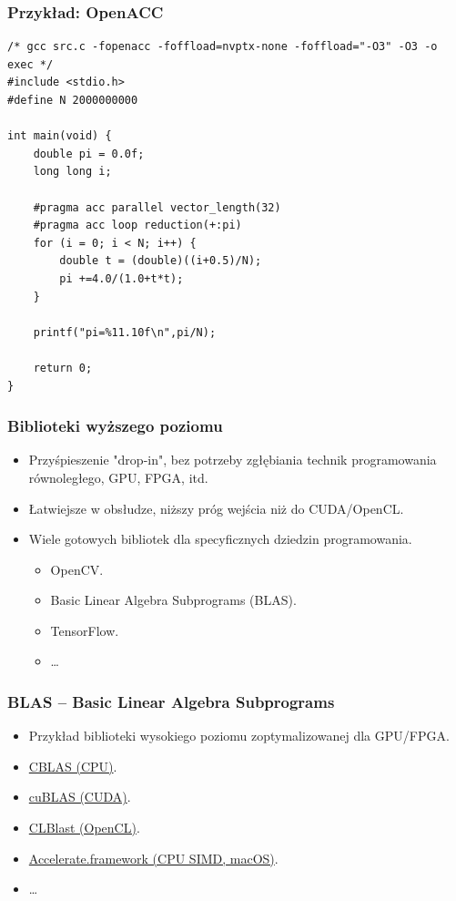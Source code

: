 \documentclass[dvipsnames,table]{beamer}
\begin{document}
\begin{frame}[fragile]
	\frametitle{Przykład: OpenACC}
\begin{lstlisting}
/* gcc src.c -fopenacc -foffload=nvptx-none -foffload="-O3" -O3 -o exec */
#include <stdio.h>
#define N 2000000000

int main(void) {
	double pi = 0.0f;
	long long i;

	#pragma acc parallel vector_length(32)
	#pragma acc loop reduction(+:pi)
	for (i = 0; i < N; i++) {
		double t = (double)((i+0.5)/N);
		pi +=4.0/(1.0+t*t);
	}

	printf("pi=%11.10f\n",pi/N);

	return 0;
}
\end{lstlisting}
\end{frame}

\begin{frame}
	\frametitle{Biblioteki wyższego poziomu}
\begin{itemize}
	\item Przyśpieszenie "drop-in", bez potrzeby zgłębiania technik programowania równoległego, GPU, FPGA, itd.
	\item Łatwiejsze w obsłudze, niższy próg wejścia niż do CUDA/OpenCL.
	\item Wiele gotowych bibliotek dla specyficznych dziedzin programowania.
	\begin{itemize}
		\item OpenCV.
		\item Basic Linear Algebra Subprograms (BLAS).
		\item TensorFlow.
		\item \ldots 
	\end{itemize}
\end{itemize}
\end{frame}

\begin{frame}
	\frametitle{BLAS -- Basic Linear Algebra Subprograms} 
\begin{itemize}
	\item Przykład biblioteki wysokiego poziomu zoptymalizowanej dla GPU/FPGA.
	\item \href{http://www.netlib.org/blas/}{CBLAS (CPU)}.
	\item \href{https://docs.nvidia.com/cuda/cublas/index.html}{cuBLAS (CUDA)}.
	\item \href{https://github.com/CNugteren/CLBlast}{CLBlast (OpenCL)}.
	\item \href{https://developer.apple.com/documentation/accelerate/blas}{Accelerate.framework (CPU SIMD, macOS)}.
	\item \ldots
\end{itemize}
\end{frame}
\end{document}
